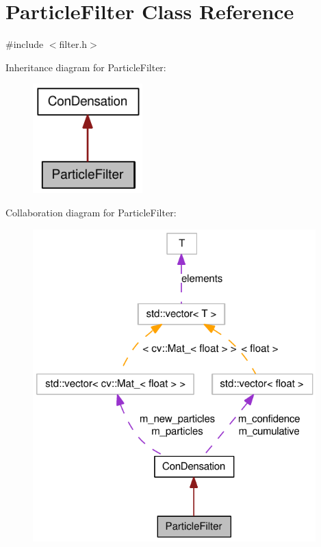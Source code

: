 \hypertarget{classParticleFilter}{
\section{ParticleFilter Class Reference}
\label{classParticleFilter}
}


{\ttfamily \#include $<$filter.h$>$}



Inheritance diagram for ParticleFilter:\nopagebreak
\begin{figure}[H]
\begin{center}
\leavevmode
\includegraphics[width=120pt]{classParticleFilter__inherit__graph}
\end{center}
\end{figure}


Collaboration diagram for ParticleFilter:\nopagebreak
\begin{figure}[H]
\begin{center}
\leavevmode
\includegraphics[width=310pt]{classParticleFilter__coll__graph}
\end{center}
\end{figure}
